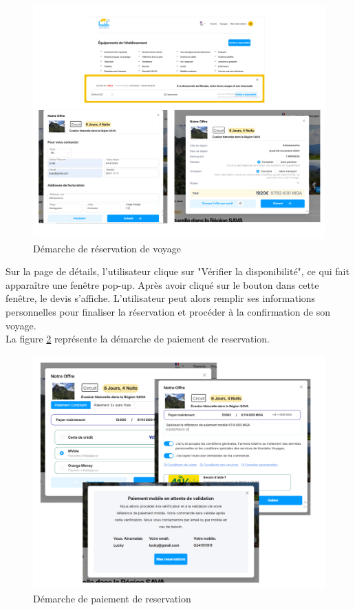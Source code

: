 \documentclass[12pt]{report}
\begin{document}
			\begin{figure}[h]
				\centering
				\includegraphics[width=\textwidth]{quotation.png}
				\caption{Démarche de réservation de voyage}
				\label{fig:quotation}
			\end{figure}
			\FloatBarrier


			Sur la page de détails, l'utilisateur clique sur "Vérifier la disponibilité", ce qui fait apparaître une fenêtre pop-up. Après avoir cliqué sur le bouton dans cette fenêtre, le devis s'affiche. L'utilisateur peut alors remplir ses informations personnelles pour finaliser la réservation et procéder à la confirmation de son voyage.\\
			
			La figure \ref{fig:paiementPage} représente la démarche de paiement de reservation.

			\begin{figure}[h]
				\centering
				\includegraphics[width=\textwidth]{paiementPage.png}
				\caption{Démarche de paiement de reservation}
				\label{fig:paiementPage}
			\end{figure}
			\FloatBarrier
\end{document}
